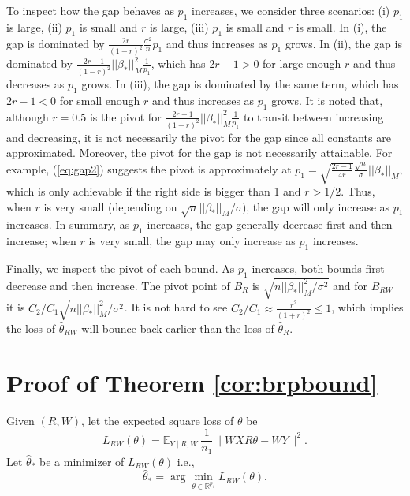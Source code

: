 \documentclass[a4paper,fleqn]{cas-sc}
\theoremstyle{plain}
\newcommand{\R}{\mathbb{R}}
\newcommand{\E}{\mathbb{E}}
\newcommand{\be}{\beta}
\newcommand{\te}{\theta}
\newcommand{\hte}{\hat{\theta}}
\begin{document}
To inspect how the gap behaves 
as $p_1$ increases, we consider 
three scenarios: (i) $p_1$ is 
large, (ii) $p_1$ is small and 
$r$ is large, (iii) $p_1$ is 
small and $r$ is small. 
In (i), the gap is dominated by 
$\frac{2r}{(1-r)^2} \frac{\sigma^2}{n} p_1$ and thus increases 
as $p_1$ grows. In (ii), 
the gap is dominated by 
$\frac{2r - 1}{(1-r)^2} 
||\be_*||_M^2 \frac{1}{p_1}$, 
which has $2r - 1 > 0$ for large 
enough $r$ and thus decreases as $p_1$ grows. In (iii), the gap is 
dominated by the same term, which has $2r - 1 < 0$ for small enough $r$ and thus increases as $p_1$ grows. 
It is noted that, although $r = 0.5$ is the pivot for $\frac{2r - 1}{(1-r)^2} ||\be_*||_M^2 \frac{1}{p_1}$ to transit 
between increasing and decreasing, 
it is not necessarily the pivot for the gap since all constants are 
approximated. Moreover, the pivot for the gap is not necessarily attainable. 
For example, (\ref{eq:gap2}) suggests 
the pivot is approximately at $p_1 = \sqrt{\frac{2r-1}{4r}} 
\frac{\sqrt{n}}{\sigma} ||\be_*||_M$, 
which is only achievable 
if the right side 
is bigger than 1 and $r > 1/2$. Thus, when $r$ is very small (depending on $\sqrt{n} 
||\be_*||_M / \sigma$), 
the gap will only increase 
as $p_1$ increases. 
In summary, as $p_1$ increases, 
the gap generally decrease first 
and then increase; when $r$ is very small, the gap may only increase 
as $p_1$ increases. 

Finally, we inspect the 
pivot of each bound. 
As $p_1$ increases, 
both bounds first decrease 
and then increase. The pivot  
point of $B_R$ is $\sqrt{n ||\be_*||_M^2/\sigma^2}$  
and for $B_{RW}$ it is $C_2/C_1 
\sqrt{n ||\be_*||_M^2/\sigma^2}$. 
It is not hard to see  
$C_2 / C_1 \approx \frac{r^2}{(1+r)^2} 
\leq 1$, which implies the 
loss of $\hte_{RW}$ will bounce back earlier than the loss of $\hte_{R}$. 
\section{Proof of Theorem \ref{cor:brpbound}}

Given $(R,W)$, let the expected 
square loss of $\te$ be  
\begin{equation}
L_{RW}(\te) = \E_{Y \mid R, W}\ 
\frac{1}{n_1} \parallel W X R \te 
- W Y \parallel^2.     
\end{equation} 
Let $\hte_*$ be 
a minimizer of $L_{RW}(\te)$ i.e., 
\begin{equation}
\hte_* = \arg\min_{\te 
\in \R^{p_1}} L_{RW}(\te).
\end{equation}
\end{document}
